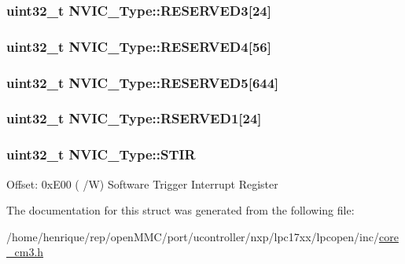 \hypertarget{structNVIC__Type_a9dd330835dbf21471e7b5be8692d77ab}{
\subsubsection[{R\-E\-S\-E\-R\-V\-E\-D3}]{\setlength{\rightskip}{0pt plus 5cm}uint32\-\_\-t N\-V\-I\-C\-\_\-\-Type\-::\-R\-E\-S\-E\-R\-V\-E\-D3\mbox{[}24\mbox{]}}}\label{structNVIC__Type_a9dd330835dbf21471e7b5be8692d77ab}
\hypertarget{structNVIC__Type_a5c0e5d507ac3c1bd5cdaaf9bbd177790}{
\subsubsection[{R\-E\-S\-E\-R\-V\-E\-D4}]{\setlength{\rightskip}{0pt plus 5cm}uint32\-\_\-t N\-V\-I\-C\-\_\-\-Type\-::\-R\-E\-S\-E\-R\-V\-E\-D4\mbox{[}56\mbox{]}}}\label{structNVIC__Type_a5c0e5d507ac3c1bd5cdaaf9bbd177790}
\hypertarget{structNVIC__Type_a4f753b4f824270175af045ac99bc12e8}{
\subsubsection[{R\-E\-S\-E\-R\-V\-E\-D5}]{\setlength{\rightskip}{0pt plus 5cm}uint32\-\_\-t N\-V\-I\-C\-\_\-\-Type\-::\-R\-E\-S\-E\-R\-V\-E\-D5\mbox{[}644\mbox{]}}}\label{structNVIC__Type_a4f753b4f824270175af045ac99bc12e8}
\hypertarget{structNVIC__Type_a6d1daf7ab6f2ba83f57ff67ae6f571fe}{
\subsubsection[{R\-S\-E\-R\-V\-E\-D1}]{\setlength{\rightskip}{0pt plus 5cm}uint32\-\_\-t N\-V\-I\-C\-\_\-\-Type\-::\-R\-S\-E\-R\-V\-E\-D1\mbox{[}24\mbox{]}}}\label{structNVIC__Type_a6d1daf7ab6f2ba83f57ff67ae6f571fe}
\hypertarget{structNVIC__Type_a0b0d7f3131da89c659a2580249432749}{
\subsubsection[{S\-T\-I\-R}]{ uint32\-\_\-t N\-V\-I\-C\-\_\-\-Type\-::\-S\-T\-I\-R}}\label{structNVIC__Type_a0b0d7f3131da89c659a2580249432749}
Offset\-: 0x\-E00 ( /\-W) Software Trigger Interrupt Register 

The documentation for this struct was generated from the following file\-:\begin{DoxyCompactItemize}
\item 
/home/henrique/rep/open\-M\-M\-C/port/ucontroller/nxp/lpc17xx/lpcopen/inc/\hyperlink{core__cm3_8h}{core\-\_\-cm3.\-h}\end{DoxyCompactItemize}
